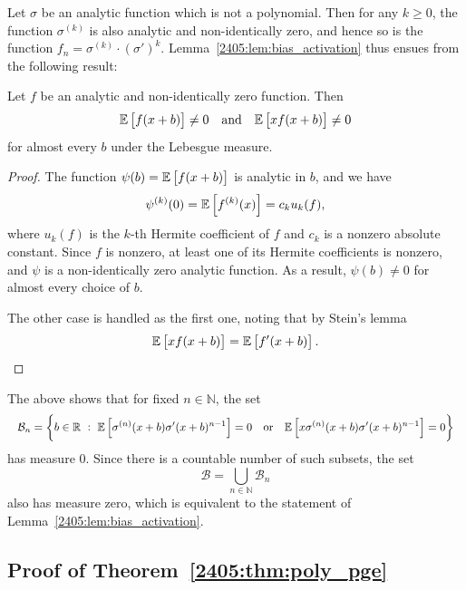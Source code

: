 Let $\sigma$ be an analytic function which is not a polynomial. Then for any $k \geq 0$, the function $\sigma^{(k)}$ is also analytic and non-identically zero, and hence so is the function $f_n = \sigma^{(k)} \cdot (\sigma')^k$. Lemma~\ref{2405:lem:bias_activation} thus ensues from the following result:
\begin{lemma}
  Let $f$ be an analytic and non-identically zero function. Then
  \[ \mathbb{E}\left[f(x+b)\right] \neq 0 \quad \text{and} \quad \mathbb{E}\left[x f(x+b)\right] \neq 0 \]
  for almost every $b$ under the Lebesgue measure.
\end{lemma}
\begin{proof}
  The function $\psi(b) = \mathbb{E}\left[f(x+b)\right]$ is analytic in $b$, and we have
  \[ \psi^{(k)}(0) = \mathbb{E}\left[f^{(k)}(x)\right] = c_k u_k(f), \]
  where $u_k(f)$ is the $k$-th Hermite coefficient of $f$ and $c_k$ is a nonzero absolute constant. Since $f$ is nonzero, at least one of its Hermite coefficients is nonzero, and $\psi$ is a non-identically zero analytic function. As a result, $\psi(b) \neq 0$ for almost every choice of $b$.

  The other case is handled as the first one, noting that by Stein's lemma
  \[ \mathbb{E}\left[x f(x+b)\right] = \mathbb{E}\left[f'(x+b)\right]. \]
\end{proof}
The above shows that for fixed $n \in \mathbb{N}$, the set
\[
  \resizebox{\linewidth}{!}{$\displaystyle
    \mathcal{B}_n = \left\{ b \in \R \ : \ \Ea{\sigma^{(n)}(x+b) \sigma'(x+b)^{n-1}} = 0 \quad \text{or} \quad \Ea{x \sigma^{(n)}(x+b) \sigma'(x+b)^{n-1}} = 0  \right\}
  $}
\]
has measure $0$. Since there is a countable number of such subsets, the set
\[ \mathcal{B} = \bigcup_{n \in \mathbb{N}} \mathcal{B}_n \]
also has measure zero, which is equivalent to the statement of Lemma~\ref{2405:lem:bias_activation}.

\subsection{Proof of Theorem~\ref{2405:thm:poly_pge}}

